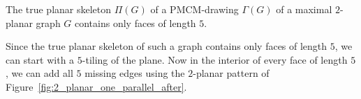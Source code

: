  \begin{corollary}\label{cor:2_planar_faces}
  The true planar skeleton $\Pi(G)$ of a PMCM-drawing $\Gamma(G)$ of a maximal $2$-planar graph $G$ contains only faces of length $5$.
 \end{corollary}






%



Since the true planar skeleton of such a graph contains only faces of length $5$, we can start with a $5$-tiling of the plane. Now in the interior of every face of length $5$, we can add all  $5$ missing edges using the $2$-planar pattern of Figure~\ref{fig:2_planar_one_parallel_after}.

